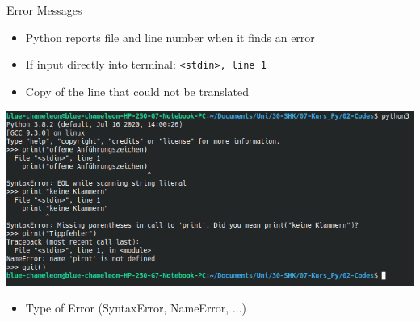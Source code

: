 \begin{frame}{Error Messages}
%
\begin{minipage}[t]{.29\linewidth}
\begin{itemize}
\item Python reports file and line number when it finds an error
\item If input directly into terminal: \texttt{<stdin>, line 1}
\item Copy of the line that could not be translated
\end{itemize}
\end{minipage}
%
%
\begin{minipage}[t]{.69\linewidth}
\vspace{0pt}
\includegraphics[width=\linewidth]{./gfx/errMsgs}
\end{minipage}
%

\vspace{6pt}
\begin{itemize}
\item Type of Error (SyntaxError, NameError, ...)
\end{itemize}
%
\end{frame}


